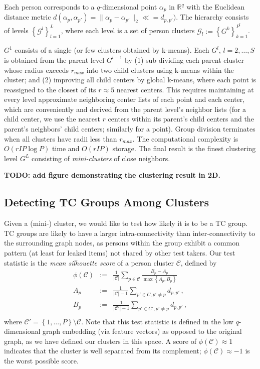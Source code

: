 \documentclass{article}
\newcommand{\cC}{\mathcal{C}}
\newcommand{\cG}{\mathcal{G}}
\newcommand{\R}{\mathbb{R}}
\begin{document}
Each person corresponds to a $q$-dimensional point $\alpha_p$ in $\R^q$ with the Euclidean distance metric $d(\alpha_p, \alpha_{p'}) = 
\|\alpha_p - \alpha_{p'} \|_2 \ll = d_{p,p'})$. The hierarchy consists of levels $\left\{\cG^l\right\}_{l=1}^L$, where each level is a set of person clusters $\cG_l := \left\{G^k\right\}_{k=1}^{P^l}$.

$G^1$ consists of a single (or few clusters obtained by k-means). Each $G^l$, $l=2,\dots,S$ is obtained from the parent level $G^{l-1}$ by (1) sub-dividing each parent cluster whose radius exceeds $r_{max}$ into two child clusters using k-means within the cluster; and (2) improving all child centers by global k-means, where each point is reassigned to the closest of its $r \approx 5$ nearest centers. This requires maintaining at every level approximate neighboring center lists of each point and each center, which are conveniently and derived from the parent level's neighbor lists (for a child center, we use the nearest $r$ centers within its parent's child centers and the parent's neighbors' child centers; similarly for a point). Group division terminates when all clusters have radii less than $r_{max}$. The computational complexity is $O(r I P \log P)$ time and $O(r I P)$ storage. The final result is the finest clustering level $G^L$ consisting of {\it mini-clusters} of close neighbors.

{\bf TODO: add figure demonstrating the clustering result in 2D.}

\subsection{Detecting TC Groups Among Clusters}
\label{group_detection}
Given a (mini-) cluster, we would like to test how likely it is to be a TC group. TC groups are likely to have a larger intra-connectivity than inter-connectivity to the surrounding graph nodes, as persons within the group exhibit a common pattern (at least for leaked items) not shared by other test takers. Our test statistic is the {\it mean silhouette score} of a person cluster $\cC$, defined by
\begin{equation}
\end{equation}
\begin{eqnarray}
	\phi(\cC) &:= & \frac{1}{|\cC|} \sum_{p \in \cC}  \frac{B_p- A_p}{\max\left\{A_p, B_p \right\}}\, \\
	A_p &:=& \frac{1}{|\cC|-1} \sum_{p' \in C, p' \not = p} d_{p,p'}\,, \\
	B_p &:=& \frac{1}{|\cC'|-1} \sum_{p' \in C', p' \not = p} d_{p,p'}\,, \\
	\label{sil}
\end{eqnarray}
where $\cC' = \left\{1,\dots,P\right\} \setminus \cC$. Note that this test statistic is defined in the low $q$-dimensional graph embedding  (via feature vectors) as opposed to the original graph, as we have defined our clusters in this space. A score of $\phi(\cC) \approx 1$ indicates that the cluster is well separated from its complement; $\phi(\cC) \approx -1$ is the worst possible score.
\end{document}
